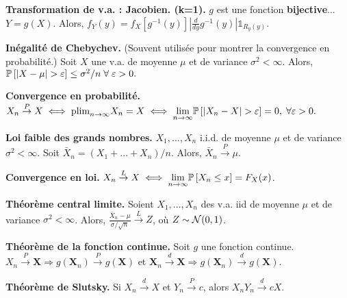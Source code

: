 \textbf{Transformation de v.a. : Jacobien. (k=1).} $g$ est une fonction \textbf{bijective}... $Y=g(X)$. Alors, $f_Y(y) = f_X[g^{-1}(y)]\left|\frac{d}{dy}g^{-1}(y)\right|\mathds{1}_{R_y(y)}$.

\textbf{Inégalité de Chebychev.} (Souvent utilisée pour montrer la convergence en probabilité.) Soit $X$ une v.a. de moyenne $\mu$ et de variance $\sigma^2< \infty$. Alors, $\mathbb{P}\left[{|X-\mu| > \varepsilon }\right] \le\sigma^2/n \; \forall \; \varepsilon > 0.$

\textbf{Convergence en probabilité.} $X_n \overset{P}{\rightarrow} X \iff \text{plim}_{n \to \infty} X_n = X \iff \underset{n \to \infty}{\lim} \mathbb{P}\left[{|X_n-X| > \varepsilon}\right] = 0, \; \forall \varepsilon > 0.$

\textbf{Loi faible des grands nombres.} $X_1, \dots, X_n$ i.i.d. de moyenne $\mu$ et de variance $\sigma^2 < \infty$. Soit $\bar{X}_n=(X_1+\dots+X_n)/n$. Alors, $\bar{X}_n \overset{P}{\to} \mu$.

\textbf{Convergence en loi.} $X_n \overset{L}{\to} X \iff \underset{n \to \infty}{\lim} \mathbb{P}\left[{X_n \le x}\right] = F_X(x)$.

\textbf{Théorème central limite.} Soient $X_1, \dots, X_n$ des v.a. iid de moyenne $\mu$ et de variance $\sigma^2 < \infty$. Alors, $\frac{\bar{X}_n - \mu}{\sigma/\sqrt{n}} \overset{L}{\to} Z$, où $Z \sim \mathcal{N}(0,1)$.

\textbf{Théorème de la fonction continue.} Soit $g$ une fonction continue. $X_n \overset{P}{\rightarrow} \mathbf{X} \Rightarrow g(\mathbf{X}_n) \overset{P}{\rightarrow} g(\mathbf{X})$ et  $\mathbf{X}_n \overset{d}{\rightarrow} \mathbf{X} \Rightarrow g(\mathbf{X}_n) \overset{d}{\rightarrow} g(\mathbf{X})$.

\textbf{Théorème de Slutsky.} Si $X_n \overset{d}{\rightarrow} X$ et $ Y_n \overset{P}{\rightarrow} c$, alors $X_nY_n \overset{d}{\to} cX$.

